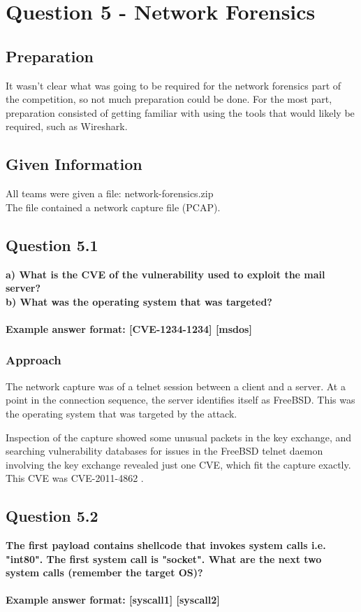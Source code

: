 \chapter{Question 5 - Network Forensics}

\section{Preparation}
It wasn't clear what was going to be required for the network forensics part
of the competition, so not much preparation could be done. For the most part,
preparation consisted of getting familiar with using the tools that would
likely be required, such as Wireshark.

\section{Given Information}
All teams were given a file: network-forensics.zip\\
The file contained a network capture file (PCAP).

\section{Question 5.1}
\textbf{a) What is the CVE of the vulnerability used to exploit the mail server?
\\b) What was the operating system that was targeted?
\\\\
Example answer format: [CVE-1234-1234] [msdos]}
\subsection{Approach}
The network capture was of a telnet session between a client and a server. At
a point in the connection sequence, the server identifies itself as FreeBSD.
This was the operating system that was targeted by the attack.

Inspection of the capture showed some unusual packets in the key exchange,
and searching vulnerability databases for issues in the FreeBSD telnet
daemon involving the key exchange revealed just one CVE, which fit the
capture exactly. This CVE was CVE-2011-4862 \cite{CVE-2011-4862}.

\section{Question 5.2}
\textbf{The first payload contains shellcode that invokes system calls i.e.
"int80". The first system call is "socket". What are the next two system calls
(remember the target OS)?
\\\\
Example answer format: [syscall1] [syscall2]}

